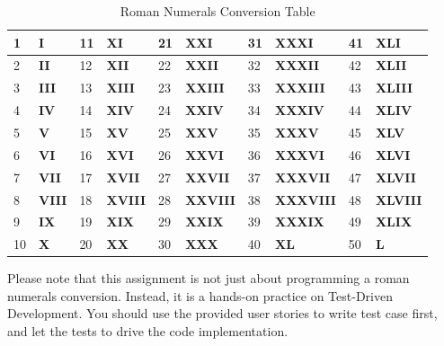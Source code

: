 \begin{table}[!h]
\centering
  \begin{tabular}{|p{0.3cm}|p{1.2cm}||p{0.3cm}|p{1.2cm}||p{0.3cm}|p{1.2cm}||p{0.3cm}|p{1.2cm}||p{0.3cm}|p{1.2cm}|}
    \hline 1 & \textbf{I} & 11 & \textbf{XI} & 21 & \textbf{XXI} & 31
    & \textbf{XXXI} & 41 & \textbf{XLI} \\ \hline 2 & \textbf{II} & 12
    & \textbf{XII} & 22 & \textbf{XXII} & 32 & \textbf{XXXII} & 42 &
    \textbf{XLII} \\ \hline 3 & \textbf{III} & 13 & \textbf{XIII} & 23
    & \textbf{XXIII} & 33 & \textbf{XXXIII} & 43 & \textbf{XLIII} \\
    \hline 4 & \textbf{IV} & 14 & \textbf{XIV} & 24 & \textbf{XXIV} &
    34 & \textbf{XXXIV} & 44 & \textbf{XLIV} \\ \hline 5 & \textbf{V}
    & 15 & \textbf{XV} & 25 & \textbf{XXV} & 35 & \textbf{XXXV} & 45 &
    \textbf{XLV} \\ \hline 6 & \textbf{VI} & 16 & \textbf{XVI} & 26 &
    \textbf{XXVI} & 36 & \textbf{XXXVI} & 46 & \textbf{XLVI} \\ \hline
    7 & \textbf{VII} & 17 & \textbf{XVII} & 27 & \textbf{XXVII} & 37 &
    \textbf{XXXVII} & 47 & \textbf{XLVII} \\ \hline 8 & \textbf{VIII}
    & 18 & \textbf{XVIII} & 28 & \textbf{XXVIII} & 38 &
    \textbf{XXXVIII}& 48 & \textbf{XLVIII} \\ \hline 9 & \textbf{IX} &
    19 & \textbf{XIX} & 29 & \textbf{XXIX} & 39 & \textbf{XXXIX} & 49
    & \textbf{XLIX} \\ \hline 10 & \textbf{X} & 20 & \textbf{XX} & 30
    & \textbf{XXX} & 40 & \textbf{XL} & 50 & \textbf{L} \\ \hline
    \end{tabular} \caption{Roman Numerals Conversion Table}
    \label{tab:AppRomanNumeralTable}
\end{table}

Please note that this assignment is not just about programming a roman
numerals conversion. Instead, it is a hands-on practice on Test-Driven
Development. You should use the provided user stories to write test
case first, and let the tests to drive the code implementation. \\

